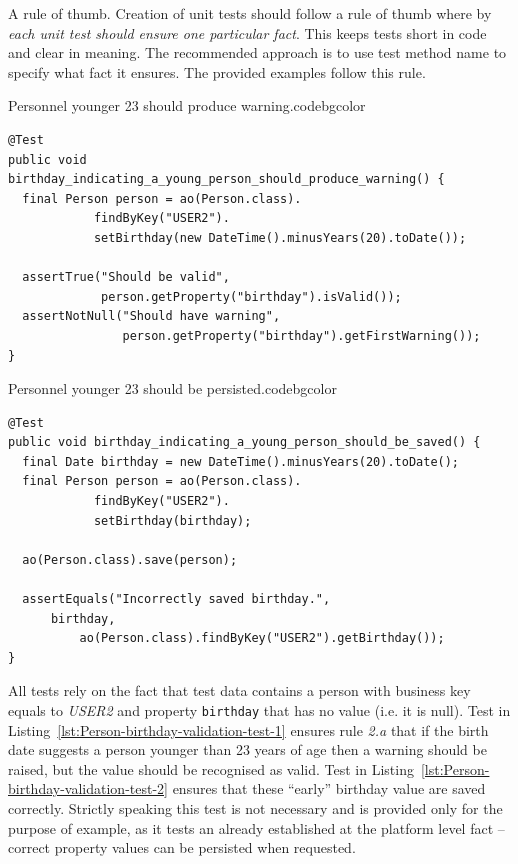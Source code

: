   \begin{notebox}{A rule of thumb.}{\label{mb:rule-of-thumb}}
    Creation of unit tests should follow a rule of thumb where by \emph{each unit test should ensure one particular fact}.
    This keeps tests short in code and clear in meaning.
    The recommended approach is to use test method name to specify what fact it ensures.
    The provided examples follow this rule.
  \end{notebox}  

 \begin{code}{Personnel younger 23 should produce warning.}{\label{lst:Person-birthday-validation-test-1}}{codebgcolor}
    \begin{lstlisting}
@Test
public void birthday_indicating_a_young_person_should_produce_warning() {	
  final Person person = ao(Person.class).
			findByKey("USER2").
			setBirthday(new DateTime().minusYears(20).toDate());	

  assertTrue("Should be valid", 
             person.getProperty("birthday").isValid());
  assertNotNull("Should have warning", 
                person.getProperty("birthday").getFirstWarning());
}
    \end{lstlisting}
  \end{code}

\begin{code}{Personnel younger 23 should be persisted.}{\label{lst:Person-birthday-validation-test-2}}{codebgcolor}
    \begin{lstlisting}
@Test
public void birthday_indicating_a_young_person_should_be_saved() {	
  final Date birthday = new DateTime().minusYears(20).toDate();
  final Person person = ao(Person.class).
			findByKey("USER2").
			setBirthday(birthday);

  ao(Person.class).save(person);

  assertEquals("Incorrectly saved birthday.", 
	  birthday,
          ao(Person.class).findByKey("USER2").getBirthday());
}
    \end{lstlisting}
  \end{code}

  All tests rely on the fact that test data contains a person with business key equals to \emph{USER2} and property \texttt{birthday} that has no value (i.e. it is null).
  Test in Listing~\ref{lst:Person-birthday-validation-test-1} ensures rule \emph{2.a} that if the birth date suggests a person younger than 23 years of age then a warning should be raised, but the value should be recognised as valid.
  Test in Listing~\ref{lst:Person-birthday-validation-test-2} ensures that these ``early'' birthday value are saved correctly.
  Strictly speaking this test is not necessary and is provided only for the purpose of example, as it tests an already established at the platform level fact -- correct property values can be persisted when requested.

